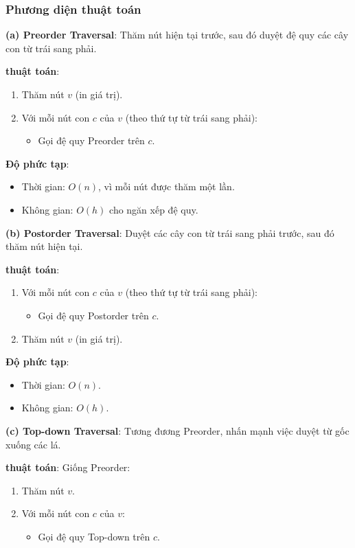 \documentclass[a4paper,12pt]{article}
\begin{document}
\subsubsection{Phương diện thuật toán}

\textbf{(a) Preorder Traversal}: Thăm nút hiện tại trước, sau đó duyệt đệ quy các cây con từ trái sang phải.

\textbf{thuật toán}:
\begin{enumerate}
    \item Thăm nút \( v \) (in giá trị).
    \item Với mỗi nút con \( c \) của \( v \) (theo thứ tự từ trái sang phải):
        \begin{itemize}
            \item Gọi đệ quy Preorder trên \( c \).
        \end{itemize}
\end{enumerate}

\textbf{Độ phức tạp}:
\begin{itemize}
    \item Thời gian: \( O(n) \), vì mỗi nút được thăm một lần.
    \item Không gian: \( O(h) \) cho ngăn xếp đệ quy.
\end{itemize}

\textbf{(b) Postorder Traversal}: Duyệt các cây con từ trái sang phải trước, sau đó thăm nút hiện tại.

\textbf{thuật toán}:
\begin{enumerate}
    \item Với mỗi nút con \( c \) của \( v \) (theo thứ tự từ trái sang phải):
        \begin{itemize}
            \item Gọi đệ quy Postorder trên \( c \).
        \end{itemize}
    \item Thăm nút \( v \) (in giá trị).
\end{enumerate}

\textbf{Độ phức tạp}:
\begin{itemize}
    \item Thời gian: \( O(n) \).
    \item Không gian: \( O(h) \).
\end{itemize}

\textbf{(c) Top-down Traversal}: Tương đương Preorder, nhấn mạnh việc duyệt từ gốc xuống các lá.

\textbf{thuật toán}: Giống Preorder:
\begin{enumerate}
    \item Thăm nút \( v \).
    \item Với mỗi nút con \( c \) của \( v \):
        \begin{itemize}
            \item Gọi đệ quy Top-down trên \( c \).
        \end{itemize}
\end{enumerate}
\end{document}
